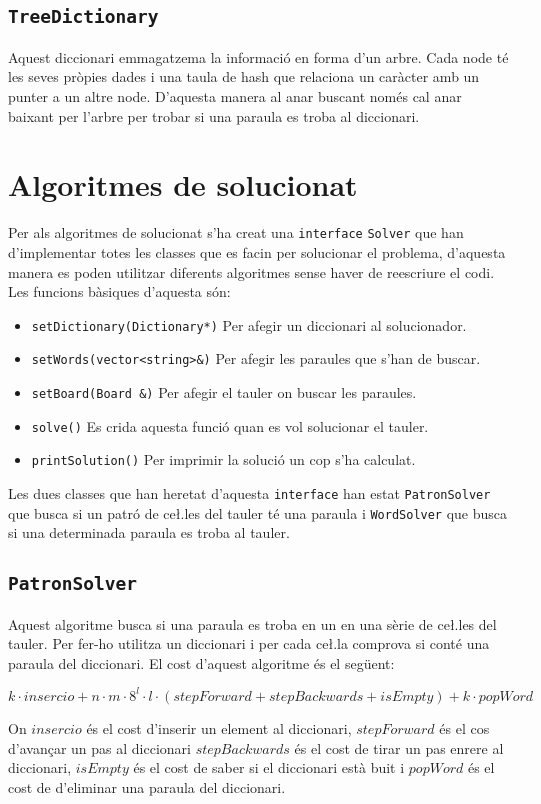 \documentclass{article}
\begin{document}
\subsection{\texttt{TreeDictionary}}
Aquest diccionari emmagatzema la informació en forma d'un arbre. Cada node té les seves pròpies dades i una taula de hash que relaciona un caràcter amb un punter a un altre node. D'aquesta manera al anar buscant només cal anar baixant per l'arbre per trobar si una paraula es troba al diccionari.

\section{Algoritmes de solucionat}

Per als algoritmes de solucionat s'ha creat una \verb|interface| \verb|Solver| que han d'implementar totes les classes que es facin per solucionar el problema, d'aquesta manera es poden utilitzar diferents algoritmes sense haver de reescriure el codi. Les funcions bàsiques d'aquesta són:

\begin{itemize}
	\item \verb|setDictionary(Dictionary*)| Per afegir un diccionari al solucionador.
	\item \verb|setWords(vector<string>&)| Per afegir les paraules que s'han de buscar.
	\item \verb|setBoard(Board &)| Per afegir el tauler on buscar les paraules.
	\item \verb|solve()| Es crida aquesta funció quan es vol solucionar el tauler.
	\item \verb|printSolution()| Per imprimir la solució un cop s'ha calculat.
\end{itemize}

Les dues classes que han heretat d'aquesta \verb|interface| han estat \verb|PatronSolver| que busca si un patró de ce\l.les del tauler té una paraula i \verb|WordSolver| que busca si una determinada paraula es troba al tauler.

\subsection{\texttt{PatronSolver}}
Aquest algoritme busca si una paraula es troba en un en una sèrie de ce\l.les del tauler. Per fer-ho utilitza un diccionari i per cada ce\l.la comprova si conté una paraula del diccionari. El cost d'aquest algoritme és el següent:

\[ k·insercio + n·m·8^l·l·(stepForward + stepBackwards + isEmpty) + k·popWord \]

On $insercio$ és el cost d'inserir un element al diccionari, $stepForward$ és el cos d'avançar un pas al diccionari $stepBackwards$ és el cost de tirar un pas enrere al diccionari, $isEmpty$ és el cost de saber si el diccionari està buit i $popWord$ és el
cost de d'eliminar una paraula del diccionari.
\end{document}
